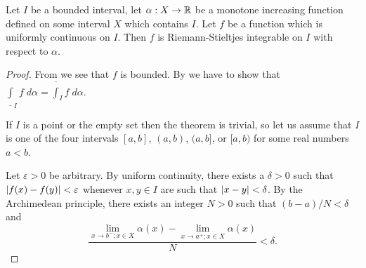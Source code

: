 \begin{ac}\label{i:ac:11.8.15}
  Let \(I\) be a bounded interval, let \(\alpha : X \to \mathbb{R}\) be a monotone increasing function defined on some interval \(X\) which contains \(I\).
  Let \(f\) be a function which is uniformly continuous on \(I\).
  Then \(f\) is Riemann-Stieltjes integrable on \(I\) with respect to \(\alpha\).
\end{ac}

\begin{proof}
  From  we see that \(f\) is bounded.
  By  we have to show that \(\underline{\int}_I f \; d \alpha = \overline{\int}_I f \; d \alpha\).

  If \(I\) is a point or the empty set then the theorem is trivial, so let us assume that \(I\) is one of the four intervals \([a, b]\), \((a, b)\), \((a, b]\), or \([a, b)\) for some real numbers \(a < b\).

  Let \(\varepsilon > 0\) be arbitrary.
  By uniform continuity, there exists a \(\delta > 0\) such that \(\left\lvert f(x) - f(y)\right\rvert < \varepsilon\) whenever \(x, y \in I\) are such that \(\left\lvert x - y\right\rvert < \delta\).
  By the Archimedean principle, there exists an integer \(N > 0\) such that \((b - a) / N < \delta\) and
  \[
    \dfrac{\lim_{x \to b^- ; x \in X} \alpha(x) - \lim_{x \to a^+ ; x \in X} \alpha(x)}{N} < \delta.
  \]


\end{proof}
